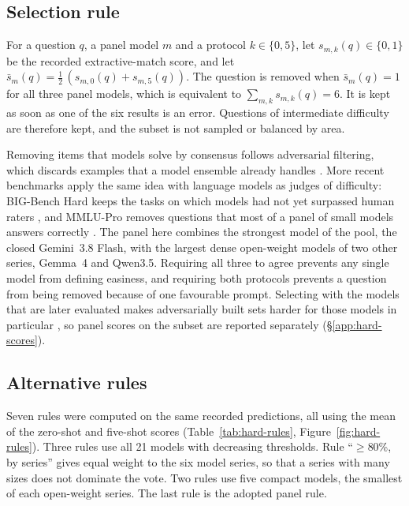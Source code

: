 \subsection{Selection rule}
\label{app:hard-rule}

For a question $q$, a panel model $m$ and a protocol
$k\in\{0,5\}$, let $s_{m,k}(q)\in\{0,1\}$ be the recorded extractive-match
score, and let $\bar s_m(q)=\tfrac12\,(s_{m,0}(q)+s_{m,5}(q))$. The question is
removed when $\bar s_m(q)=1$ for all three panel models, which is equivalent
to $\sum_{m,k}s_{m,k}(q)=6$. It is kept as soon as one of the six results
is an error. Questions of intermediate difficulty are therefore kept, and the
subset is not sampled or balanced by area.

Removing items that models solve by consensus follows adversarial filtering,
which discards examples that a model ensemble already handles
\citep{zellers2018swag,zellers2019hellaswag,lebras2020aflite}. More recent
benchmarks apply the same idea with language models as judges of
difficulty: BIG-Bench Hard keeps the tasks on which models had not yet
surpassed human raters \citep{suzgun2023bbh}, and MMLU-Pro removes questions
that most of a panel of small models answers correctly
\citep{wang2024mmlupro}. The panel here combines the strongest model of the
pool, the closed Gemini~3.8 Flash, with the largest dense open-weight models
of two other series, Gemma~4 and Qwen3.5. Requiring all three to agree prevents any single model from
defining easiness, and requiring both protocols prevents a question from
being removed because of one favourable prompt. Selecting with the models
that are later evaluated makes adversarially built sets harder for those
models in particular \citep{phang2022adversarially}, so panel scores on the
subset are reported separately (\S\ref{app:hard-scores}).

\subsection{Alternative rules}
\label{app:hard-alternatives}

Seven rules were computed on the same recorded predictions, all using the
mean of the zero-shot and five-shot scores
(Table~\ref{tab:hard-rules}, Figure~\ref{fig:hard-rules}). Three rules use
all 21 models with decreasing thresholds. Rule ``$\geq$80\%, by
series'' gives equal weight to the six model series, so that a series with
many sizes does not dominate the vote. Two rules use five compact models, the
smallest of each open-weight series. The last rule is the
adopted panel rule.

